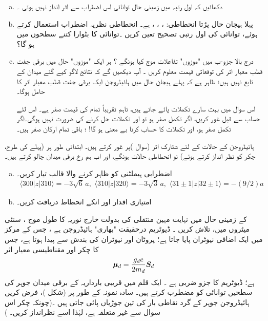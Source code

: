 \begin{enumerate}[a.]
\item
 دکھائیں کہ اول رتبہ میں زمینی حال توانائی اس اضطراب سے اثر انداز نہیں ہوتی ۔
\item
پہلا ہیجان حال  پڑتا انحطاطی:    ، ، ،   ہے۔ انحطاطی نظریہ اضطراب استعمال کرتے ہوئے، توانائی کی   اول رتبی  تصحیح  تعین کریں ۔توانائی   کا بٹوارا  کتنے سطحوں میں  ہو گا؟
\item
 درج بالا جزو-ب میں "موزوں" تفاعلات موج کیا ہونگے ؟  ہر ایک "موزوں" حال میں برقی جفت  قطب معیار اثر  کی توقعاتی قیمت معلوم کریں ۔ آپ دیکھیں گے کہ نتائج  لاگو کیے گئے  میدان کے تابع نہیں ہیں؛   ظاہر ہے کہ  پہلے  ہیجان حال میں ہائیڈروجن ایک   برقی جفت قطب معیار اثر کا حامل ہوگا۔
 
   اس سوال میں بہت سارے تکملات  پائے جاتے ہیں،  تاہم  تقریباً  تمام کی قیمت صفر  ہے۔  اس لئے  حساب سے قبل غور کریں،  اگر   تکمل  صفر ہو تو    اور   تکملات حل کرنے  کی ضرورت نہیں ہوگی۔اگر  تکمل صفر ہو،  اور  تکملات کا حساب کرنا بے معنی ہو گا!  ؛ باقی تمام ارکان صفر ہیں۔ 
\end{enumerate}
 ہائیڈروجن کے  حالات کے لئے شٹارک  اثر (سوال )پر غور کرتے ہیں۔  ابتدائی  طور پر  (پہلے کی طرح، چکر کو نظر انداز کرتے ہوئے)  نو  انحطاطی حالات 
 ہونگے،  اور اب ہم   رخ برقی میدان چالو کرتے ہیں۔
\begin{enumerate}[a.]
\item
اضطرابی  ہیملٹنی  کو ظاہر کرنے والا   قالب   تیار کریں۔ 
\begin{align*}
\langle 300|z|310\rangle =-3\sqrt{6}\,a,\,\,\langle 310|z|320\rangle =-3\sqrt{3}\,a,\,\,\langle 31\pm1|z|32\pm1\rangle=-(9/2)a
\end{align*}
\item 
امتیازی اقدار اور انکے انحطاط  دریافت کریں۔ 
\end{enumerate}
 کے  زمینی حال  میں نہایت مہین منتقلی کی بدولت   خارج  نوریہ  کا طول موج ، سنٹی میٹروں میں،  تلاش کریں ۔ ڈیوٹریم درحقیقت "بھاری"  ہائیڈروجن ہے ، جس کے مرکز میں ایک اضافی نیوٹران پایا جاتا ہے؛ پروٹان اور نیوٹران  کی بندش سے     پیدا ہوتا ہے،  جس کا چکر  اور  مقناطیسی معیار اثر
\begin{align*}
{\ensuremath{{\boldsymbol{\mu}}}}_{d}=\frac{g_{d}e}{2m_{d}}{{\boldsymbol{S}}}_{d}
\end{align*}
ہے؛   ڈیوٹریم کا   جزو ضربی  ہے ۔
 ایک قلم میں قریبی  بارداریہ  کے برقی میدان جوہر کی سطحیں   توانائی   کو مضطرب کرتے ہیں۔ سادہ نمونہ کے طور پر   (شکل )،    فرض کریں  ہائیڈروجن  جوہر کے گرد  نقاطی  بار  کی تین جوڑیاں پائی جاتی ہیں ۔(چونکہ    چکر  اس سوال سے   غیر متعلقہ  ہے،  لہٰذا اسے نظرانداز کریں۔ )
 
